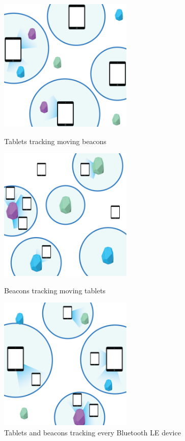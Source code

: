 \begin{figure}
\centering
\includegraphics[width=2.5in]{images/room-places-use-case-1.png}
\caption{Tablets tracking moving beacons}
\label{fig:use_case_1}
\includegraphics[width=2.5in]{images/room-places-use-case-2.png}
\caption{Beacons tracking moving tablets}
\label{fig:use_case_2}
\includegraphics[width=2.5in]{images/room-places-use-case-3.png}
\caption{Tablets and beacons tracking every Bluetooth LE device}
\label{fig:use_case_3}
\end{figure}

